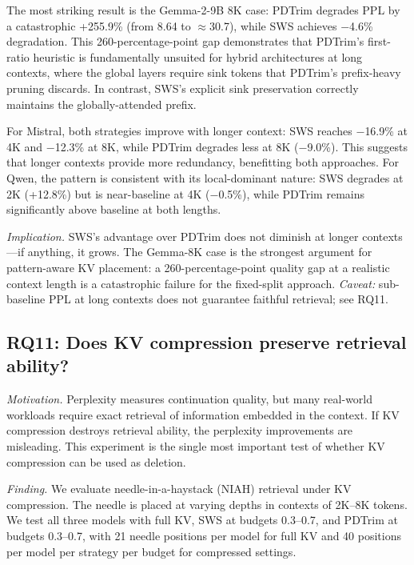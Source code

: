 \documentclass[11pt]{article}
\newcommand{\method}{SWS}
\newcommand{\sws}{SWS}
\newcommand{\pct}{\%}
\theoremstyle{definition}
\theoremstyle{plain}
\begin{document}
The most striking result is the Gemma-2-9B 8K case: PDTrim degrades PPL by a catastrophic +255.9\pct{} (from 8.64 to $\approx$30.7), while \sws{} achieves $-$4.6\pct{} degradation.  This 260-percentage-point gap demonstrates that PDTrim's first-ratio heuristic is fundamentally unsuited for hybrid architectures at long contexts, where the global layers require sink tokens that PDTrim's prefix-heavy pruning discards.  In contrast, \sws{}'s explicit sink preservation correctly maintains the globally-attended prefix.

For Mistral, both strategies improve with longer context: \sws{} reaches $-$16.9\pct{} at 4K and $-$12.3\pct{} at 8K, while PDTrim degrades less at 8K ($-$9.0\pct{}).  This suggests that longer contexts provide more redundancy, benefitting both approaches.  For Qwen, the pattern is consistent with its local-dominant nature: \sws{} degrades at 2K (+12.8\pct{}) but is near-baseline at 4K ($-$0.5\pct{}), while PDTrim remains significantly above baseline at both lengths.

\emph{Implication.}  \method{}'s advantage over PDTrim does not diminish at longer contexts---if anything, it grows.  The Gemma-8K case is the strongest argument for pattern-aware KV placement: a 260-percentage-point quality gap at a realistic context length is a catastrophic failure for the fixed-split approach.  \emph{Caveat:} sub-baseline PPL at long contexts does not guarantee faithful retrieval; see RQ11.

\subsection{RQ11: Does KV compression preserve retrieval ability?}
\label{sec:rq11}

\emph{Motivation.}  Perplexity measures continuation quality, but many real-world workloads require exact retrieval of information embedded in the context.  If KV compression destroys retrieval ability, the perplexity improvements are misleading.  This experiment is the single most important test of whether KV compression can be used as deletion.

\emph{Finding.}  We evaluate needle-in-a-haystack (NIAH) retrieval under KV compression.  The needle is placed at varying depths in contexts of 2K--8K tokens.  We test all three models with full KV, \sws{} at budgets 0.3--0.7, and PDTrim at budgets 0.3--0.7, with 21 needle positions per model for full KV and 40 positions per model per strategy per budget for compressed settings.
\end{document}
